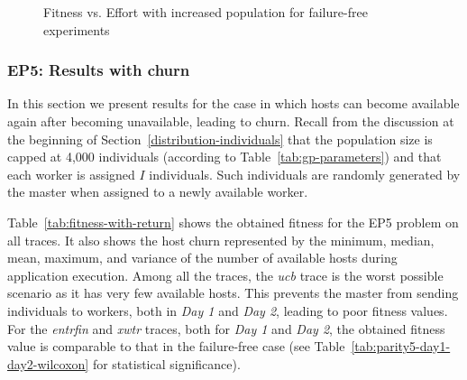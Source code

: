 \documentclass[graybox]{sty/svmult}
\begin{document}
\begin{figure*}
    \centering
    \label{fig:ep5-11m-fitness-effort}
    \caption{Fitness vs. Effort with increased population for failure-free experiments}
\end{figure*}

\subsubsection{EP5: Results with churn}

In this section we present results for the case in which hosts can become
available again after becoming unavailable, leading to churn.  Recall from
the discussion at the beginning of Section~\ref{distribution-individuals}
that the population size is capped at 4,000 individuals (according to
Table~\ref{tab:gp-parameters}) and that each worker is assigned $I$
individuals. Such individuals are randomly generated by the master when
assigned to a newly available worker.

Table~\ref{tab:fitness-with-return} shows the obtained fitness for the EP5
problem on all traces. It also shows the host churn represented by the
minimum, median, mean, maximum, and variance of the number of available
hosts during application execution. Among all the traces, the \emph{ucb}
trace is the worst possible scenario as it has very few available
hosts. This prevents the master from sending individuals to workers,
both in \emph{Day 1} and \emph{Day 2}, leading to poor fitness values.
For the \emph{entrfin} and \emph{xwtr} traces, both for \emph{Day 1}
and \emph{Day 2}, the obtained fitness value is comparable to that in
the failure-free case  (see Table~\ref{tab:parity5-day1-day2-wilcoxon}
for statistical significance).
\end{document}
